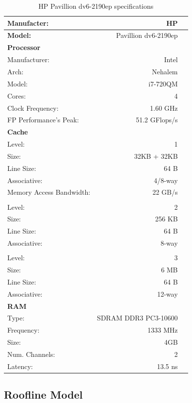 \documentclass[a4paper,10pt,openright,openbib]{article}
\begin{document}
\begin{table}[!htp]
		\begin{tabular}{lrl}
			\hline 
			\textbf{Manufacter:} & HP \\
			\hline 
			\textbf{Model:} & Pavillion dv6-2190ep \\
			\hline 
			\textbf{Processor} & & \\
			Manufacturer: & Intel & \\
			Arch: & Nehalem & \\
			Model: & i7-720QM & \\
			Cores: & 4 & \\
			Clock Frequency: & 1.60 GHz & \\
			FP Performance's Peak: & 51.2 GFlops/s & \\
			\hline 
			\textbf{Cache} & & \\
			Level: & 1 & \\
			Size: & 32KB + 32KB & \\
			Line Size: & 64 B & \\
			Associative: & 4/8-way & \\
			Memory Access Bandwidth: & 22 GB/s & \\
			\\
			Level: & 2 & \\
			Size: & 256 KB & \\
			Line Size: & 64 B & \\
			Associative: & 8-way & \\
			\\
			Level: & 3 & \\
			Size: & 6 MB & \\
			Line Size: & 64 B & \\
			Associative: & 12-way & \\
			\hline 
			\textbf{RAM} \\
			Type: & SDRAM DDR3 PC3-10600 & \\
			Frequency: & 1333 MHz & \\
			Size: & 4GB & \\
			Num. Channels: & 2 & \\
			Latency: & 13.5 ns & \\
		\end{tabular}
		\caption{HP Pavillion dv6-2190ep specifications}
		\label{tab:hp}
\end{table}


\subsection{Roofline Model}
\end{document}
